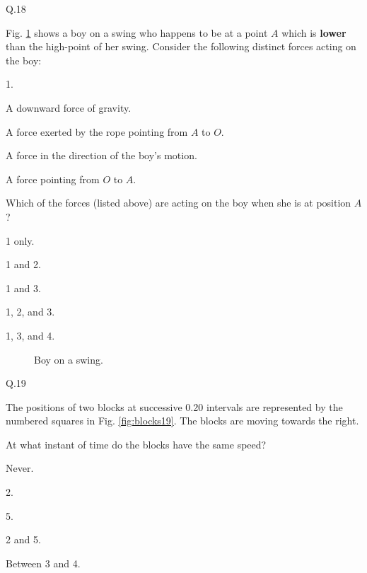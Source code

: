     \begin{mcq}{Q.18}{Fig. \ref{fig:swing} shows a boy on a swing who happens to be at a point $A$ which is \textbf{lower} than the high-point of her swing. Consider the following distinct forces acting on the boy:

        \eline[]
        \begin{options}{1.}
            \item A downward force of gravity.
            \item A force exerted by the rope pointing from $A$ to $O$.
            \item A force in the direction of the boy's motion.
            \item A force pointing from $O$ to $A$.
        \end{options}
        \eline[]

        Which of the forces (listed above) are acting on the boy when she is at position $A$?
    } 
        \item 1 only.
        \item 1 and 2.
        \item 1 and 3.
        \item 1, 2, and 3.
        \item 1, 3, and 4.
    \end{mcq}

    \eline[-5]
    \begin{minipage}{\textwidth}
        \begin{figure}[H]
            \begin{center}
                
                \caption{\label{fig:swing} Boy on a swing.}
            \end{center}
        \end{figure}
    \end{minipage}

    \begin{mcq}{Q.19}{The positions of two blocks at successive \SI{0.20}{\sec} intervals are represented by the numbered squares in Fig. \ref{fig:blocks19}. The blocks are moving towards the right.
       
        At what instant of time do the blocks have the same speed?
    }
        \item Never.
        \item 2.
        \item 5.
        \item 2 and 5.
        \item Between 3 and 4.
    \end{mcq}


